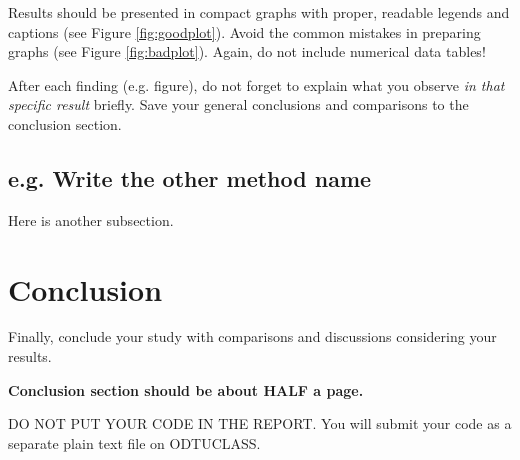 \documentclass[letterpaper,12pt]{article}
\begin{document}
Results should be presented in compact graphs with proper, readable legends and captions (see
Figure \ref{fig:goodplot}). Avoid the common mistakes in preparing graphs (see
Figure \ref{fig:badplot}). Again, do not include numerical data tables!

After each finding (e.g. figure), do not forget to explain what you observe
\textit{in that specific result} briefly. Save your general conclusions and comparisons
to the conclusion section.

\subsection{e.g. Write the other method name}

Here is another subsection.

\section{Conclusion}

Finally, conclude your study with comparisons and discussions considering your results.

 \textbf{Conclusion section should be about HALF a page.}

{\vspace{1cm}\Huge DO NOT PUT YOUR CODE IN THE REPORT.} You will submit your code as a separate plain text file on ODTUCLASS.
\end{document}
